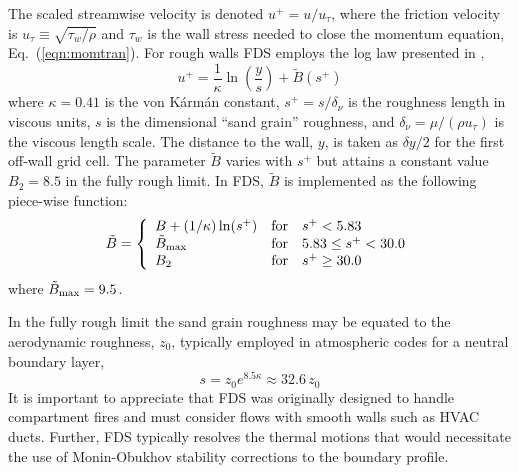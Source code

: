 \documentclass[journal,article,atmosphere,submit,moreauthors,pdftex]{Definitions_Review_Process/mdpi}
\begin{document}
The scaled streamwise velocity is denoted $u^+ = u/u_\tau$, where the friction velocity is $u_\tau \equiv \sqrt{\tau_w/\rho}$ and $\tau_w$ is the wall stress needed to close the momentum equation, Eq.~(\ref{eqn:momtran}).  For rough walls FDS employs the log law presented in \cite{Pope:2000},
\begin{equation}
\label{eqn_roughwallloglaw}
u^+ = \frac{1}{\kappa} \ln \left(\frac{y}{s}\right) + \tilde{B}(s^+)
\end{equation}
where $\kappa = 0.41$ is the von K\'arm\'an constant, $s^+ = s/\delta_\nu$ is the roughness length in viscous units, $s$ is the dimensional ``sand grain'' roughness, and $\delta_\nu = \mu/(\rho u_\tau)$ is the viscous length scale. The distance to the wall, $y$, is taken as $\delta y/2$ for the first off-wall grid cell.  The parameter $\tilde{B}$ varies with $s^+$ but attains a constant value $B_2=8.5$ in the fully rough limit.  In FDS, $\tilde{B}$ is implemented as the following piece-wise function:
\begin{equation}
\tilde{B} = \left\{ \begin{array}{lll} B + (1/\kappa)\ln(s^+) & \mbox{for} & s^+ < 5.83 \\
\tilde{B}_{\rm max} & \mbox{for} & 5.83 \le s^+ < 30.0 \\
B_2 & \mbox{for} & s^+ \ge 30.0 \end{array} \right.
\end{equation}
where $\tilde{B}_{\rm max} = 9.5$.

In the fully rough limit the sand grain roughness may be equated to the aerodynamic roughness, $z_0$, typically employed in atmospheric codes for a neutral boundary layer,
\begin{equation}
s = z_0 e^{8.5 \kappa} \approx 32.6 \, z_0
\end{equation}
It is important to appreciate that FDS was originally designed to handle compartment fires and must consider flows with smooth walls such as HVAC ducts.  Further, FDS typically resolves the thermal motions that would necessitate the use of Monin-Obukhov stability corrections to the boundary profile.
\end{document}

